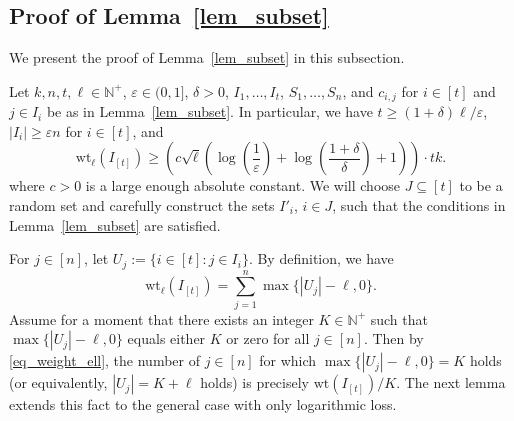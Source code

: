 \documentclass[11pt]{article}
\renewcommand{\epsilon}{\varepsilon}
\newcommand{\N}{{\mathbb{N}}}
\begin{document}
\subsection{Proof of Lemma~\ref{lem_subset}}\label{sec_comb}

We present the proof of Lemma~\ref{lem_subset} in this subsection.

Let $k,n,t,\ell\in\N^+$, $\epsilon\in (0,1]$, $\delta>0$, $I_1,\dots,I_t$,
$S_1,\dots, S_n$,
and $c_{i,j}$ for $i\in [t]$ and $j\in I_i$
be as in Lemma~\ref{lem_subset}.
In particular, we have $t\geq (1+\delta)\ell/\epsilon$,
 $|I_i|\geq \epsilon n$ for $i\in [t]$, and
\begin{equation}\label{eq_weightbound}
  \mathrm{wt}_\ell(I_{[t]})\geq \left(c\sqrt{\ell}\left(\log\left(\frac{1}{\epsilon}\right)+\log\left( \frac{1+\delta}{\delta }\right)+1\right)\right)\cdot tk.
\end{equation}
where $c>0$ is a large enough absolute constant.
We will choose $J\subseteq [t]$ to be a random set and  carefully construct the sets $I'_i$, $i\in J$, such that the conditions in Lemma~\ref{lem_subset} are satisfied.

For $j\in [n]$, let $U_j:=\{i\in [t]: j\in I_i\}$. By definition, we have
\begin{equation}\label{eq_weight_ell}
\mathrm{wt}_\ell(I_{[t]})=\sum_{j=1}^n \max\{|U_j|-\ell, 0\}.
\end{equation}
Assume for a moment that there exists an integer $K\in\N^+$ such that $\max\{|U_j|-\ell, 0\}$ equals either $K$ or zero for all $j\in [n]$. Then by \eqref{eq_weight_ell}, the number of $j\in [n]$ for which $\max\{|U_j|-\ell, 0\}=K$ holds (or equivalently, $|U_j|=K+\ell$ holds) is precisely $\mathrm{wt}(I_{[t]})/K$.
The next lemma extends this fact to the general case with only logarithmic loss.
\end{document}
